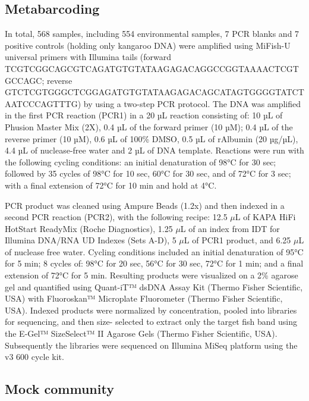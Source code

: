 \documentclass[9pt,twoside,lineno]{pnas-SI}
\begin{document}
\subsection*{Metabarcoding}
In total, 568 samples, including 554 environmental samples, 7 PCR blanks and 7 positive controls (holding only kangaroo DNA) were amplified using MiFish-U universal primers \cite{miya2015} with Illumina tails (forward TCGTCGGCAGCGTCAGATGTGTATAAGAGACAGGCCGGTAAAACTCGTGCCAGC; reverse GTCTCGTGGGCTCGGAGATGTGTATAAGAGACAGCATAGTGGGGTATCTAATCCCAGTTTG) by using a two-step PCR protocol. The DNA was amplified in the first PCR reaction (PCR1) in a 20 µL reaction consisting of: 10 µL of Phusion Master Mix (2X), 0.4 µL of the forward primer (10 µM); 0.4 µL of the reverse primer (10 µM), 0.6 µL of 100\% DMSO, 0.5 µL of rAlbumin (20 µg/µL), 4.4 µL of nuclease-free water and 2 µL of DNA template. Reactions were run with the following cycling conditions: an initial denaturation of 98°C for 30 sec; followed by 35 cycles of 98°C for 10 sec, 60°C for 30 sec, and of 72°C for 3 sec; with a final extension of 72°C for 10 min and hold at 4°C. 

PCR product was cleaned using Ampure Beads (1.2x) and then indexed in a second PCR reaction (PCR2), with the following recipe: 12.5 $\mu$L of KAPA HiFi HotStart ReadyMix (Roche Diagnostics), 1.25 $\mu$L of an index from IDT for Illumina DNA/RNA UD Indexes (Sets A-D), 5 $\mu$L of PCR1 product, and 6.25 $\mu$L of nuclease free water. Cycling conditions included an initial denaturation of 95°C for 5 min; 8 cycles of: 98°C for 20 sec, 56°C for 30 sec, 72°C for 1 min; and a final extension of 72°C for 5 min. Resulting products were visualized on a 2\% agarose gel and quantified using Quant-iT™ dsDNA Assay Kit (Thermo Fisher Scientific, USA) with Fluoroskan™ Microplate Fluorometer (Thermo Fisher Scientific, USA). Indexed products were normalized by concentration, pooled into libraries for sequencing, and then size- selected to extract only the target fish band using the E-Gel™ SizeSelect™ II Agarose Gels (Thermo Fisher Scientific, USA).  Subsequently the libraries were sequenced on Illumina MiSeq platform using the v3 600 cycle kit. 


\subsection*{Mock community}
\end{document}
